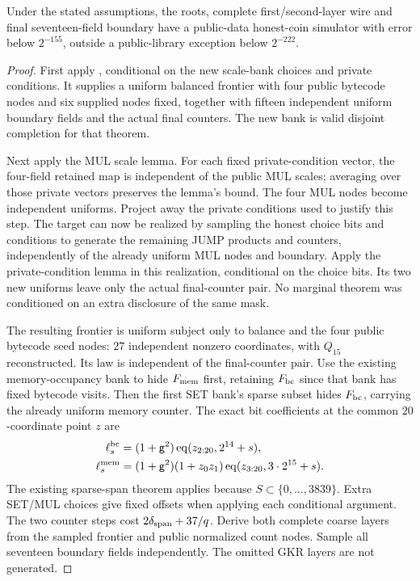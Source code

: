 \begin{theorem}
Under the stated assumptions, the roots, complete first/second-layer wire and final seventeen-field boundary have a public-data honest-coin simulator with error below $2^{-155}$, outside a public-library exception below $2^{-222}$.
\end{theorem}
\begin{proof}
First apply , conditional on the new scale-bank choices and private conditions. It supplies a uniform balanced frontier with four public bytecode nodes and six supplied nodes fixed, together with fifteen independent uniform boundary fields and the actual final counters. The new bank is valid disjoint completion for that theorem.

Next apply the MUL scale lemma. For each fixed private-condition vector, the four-field retained map is independent of the public MUL scales; averaging over those private vectors preserves the lemma's bound. The four MUL nodes become independent uniforms. Project away the private conditions used to justify this step. The target can now be realized by sampling the honest choice bits and conditions to generate the remaining JUMP products and counters, independently of the already uniform MUL nodes and boundary. Apply the private-condition lemma in this realization, conditional on the choice bits. Its two new uniforms leave only the actual final-counter pair. No marginal theorem was conditioned on an extra disclosure of the same mask.

The resulting frontier is uniform subject only to balance and the four public bytecode seed nodes: $27$ independent nonzero coordinates, with $Q_{15}$ reconstructed. Its law is independent of the final-counter pair. Use the existing memory-occupancy bank to hide $F_{\rm mem}$ first, retaining $F_{\rm bc}$ since that bank has fixed bytecode visits. Then the first SET bank's sparse subset hides $F_{\rm bc}$, carrying the already uniform memory counter. The exact bit coefficients at the common $20$-coordinate point $z$ are
\[
\begin{aligned}
 \ell_s^{\rm bc}&=(1+\mathsf{g}^2)\operatorname{eq}(z_{2:20},2^{14}+s),\\
 \ell_s^{\rm mem}&=(1+\mathsf{g}^2)(1+z_0z_1)\operatorname{eq}(z_{3:20},3\cdot2^{15}+s).
\end{aligned}
\]
The existing sparse-span theorem applies because $S\subset\{0,\ldots,3839\}$. Extra SET/MUL choices give fixed offsets when applying each conditional argument. The two counter steps cost $2\delta_{\rm span}+37/q$. Derive both complete coarse layers from the sampled frontier and public normalized count nodes. Sample all seventeen boundary fields independently. The omitted GKR layers are not generated.
\end{proof}

